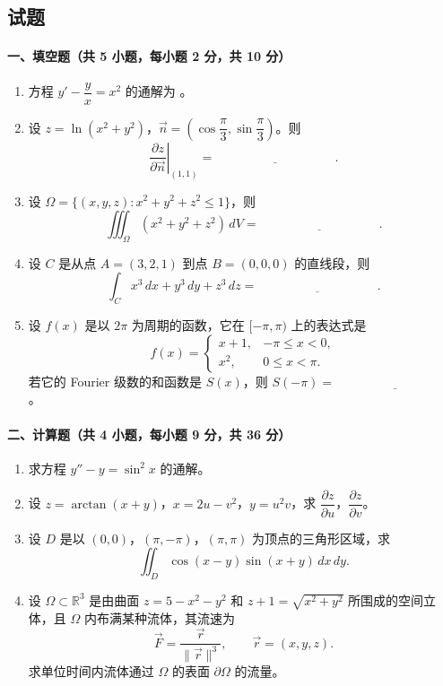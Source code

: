 \subsection{试题}

\paragraph{一、填空题（共 5 小题，每小题 2 分，共 10 分）}
\begin{enumerate}
  \item 方程 $y'-\dfrac{y}{x}=x^2$ 的通解为 \underline{\hspace{4cm}}。
  \item 设 $z=\ln(x^2+y^2)$，$\vec n=\left(\cos\dfrac{\pi}{3},\sin\dfrac{\pi}{3}\right)$。则
  \[
    \left.\frac{\partial z}{\partial \vec n}\right|_{(1,1)}=\underline{\hspace{4cm}}.
  \]
  \item 设 $\Omega=\{(x,y,z):x^2+y^2+z^2\le 1\}$，则
  \[
    \iiint_\Omega (x^2+y^2+z^2)\,dV=\underline{\hspace{4cm}}.
  \]
  \item 设 $C$ 是从点 $A=(3,2,1)$ 到点 $B=(0,0,0)$ 的直线段，则
  \[
    \int_C x^3\,dx+y^3\,dy+z^3\,dz=\underline{\hspace{4cm}}.
  \]
  \item 设 $f(x)$ 是以 $2\pi$ 为周期的函数，它在 $[-\pi,\pi)$ 上的表达式是
  \[
    f(x)=
    \begin{cases}
      x+1, & -\pi\le x<0,\\
      x^2, & 0\le x<\pi.
    \end{cases}
  \]
  若它的 Fourier 级数的和函数是 $S(x)$，则 $S(-\pi)=\underline{\hspace{4cm}}$。
\end{enumerate}

\paragraph{二、计算题（共 4 小题，每小题 9 分，共 36 分）}
\begin{enumerate}
  \item 求方程 $y''-y=\sin^2x$ 的通解。
  \item 设 $z=\arctan(x+y)$，$x=2u-v^2$，$y=u^2v$，求 $\dfrac{\partial z}{\partial u}$，$\dfrac{\partial z}{\partial v}$。
  \item 设 $D$ 是以 $(0,0)$，$(\pi,-\pi)$，$(\pi,\pi)$ 为顶点的三角形区域，求
  \[
    \iint_D \cos(x-y)\sin(x+y)\,dx\,dy.
  \]
  \item 设 $\Omega\subset\mathbb R^3$ 是由曲面 $z=5-x^2-y^2$ 和 $z+1=\sqrt{x^2+y^2}$ 所围成的空间立体，且 $\Omega$ 内布满某种流体，其流速为
  \[
    \vec F=\frac{\vec r}{\|\vec r\|^3},\qquad \vec r=(x,y,z).
  \]
  求单位时间内流体通过 $\Omega$ 的表面 $\partial\Omega$ 的流量。
\end{enumerate}

